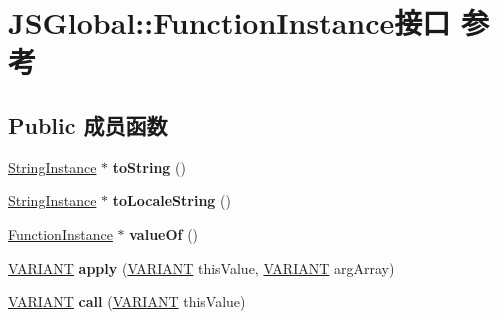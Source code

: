 \hypertarget{interface_j_s_global_1_1_function_instance}{}\section{J\+S\+Global\+:\+:Function\+Instance接口 参考}
\label{interface_j_s_global_1_1_function_instance}
\subsection*{Public 成员函数}
\begin{DoxyCompactItemize}
\item 
\mbox{\label{interface_j_s_global_1_1_function_instance_a47fda7e7bc2bd946a93566a2c93d3583}} 
\hyperlink{interface_j_s_global_1_1_string_instance}{String\+Instance} $\ast$ {\bfseries to\+String} ()
\item 
\mbox{\label{interface_j_s_global_1_1_function_instance_a6364fbab6542d849c33a33af374d057d}} 
\hyperlink{interface_j_s_global_1_1_string_instance}{String\+Instance} $\ast$ {\bfseries to\+Locale\+String} ()
\item 
\mbox{\label{interface_j_s_global_1_1_function_instance_a03e6193a4f5a0c623954eef94a935c7f}} 
\hyperlink{interface_j_s_global_1_1_function_instance}{Function\+Instance} $\ast$ {\bfseries value\+Of} ()
\item 
\mbox{\label{interface_j_s_global_1_1_function_instance_a52a4c0f106e4abca8fb1f21631493f60}} 
\hyperlink{structtag_v_a_r_i_a_n_t}{V\+A\+R\+I\+A\+NT} {\bfseries apply} (\hyperlink{structtag_v_a_r_i_a_n_t}{V\+A\+R\+I\+A\+NT} this\+Value, \hyperlink{structtag_v_a_r_i_a_n_t}{V\+A\+R\+I\+A\+NT} arg\+Array)
\item 
\mbox{\label{interface_j_s_global_1_1_function_instance_a8983a574c6f16820d60b4e77f92b4ead}} 
\hyperlink{structtag_v_a_r_i_a_n_t}{V\+A\+R\+I\+A\+NT} {\bfseries call} (\hyperlink{structtag_v_a_r_i_a_n_t}{V\+A\+R\+I\+A\+NT} this\+Value)
\item 
\mbox{\label{interface_j_s_global_1_1_function_instance_a3472e9da1cf4bf254ed1d9a0fe2b7022}} 

\end{DoxyCompactItemize}
